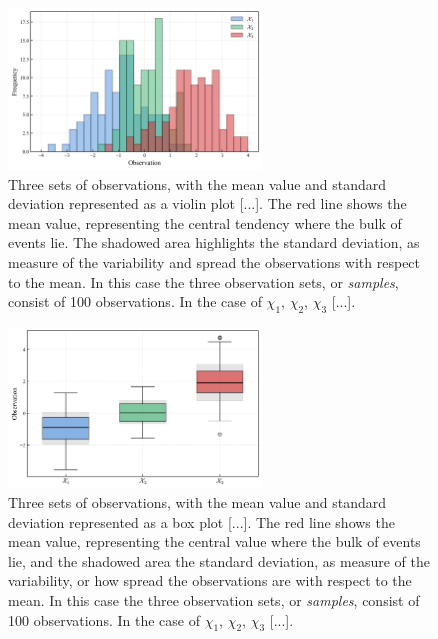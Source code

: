 \documentclass{book}
\begin{document}
\medskip

\begin{figure}[ht]
    \centering
    \includegraphics[width=0.6\textwidth]{figures/chapter1/mean_std_hist.png}
    \caption{Three sets of observations, with the mean value and standard deviation represented as a violin plot [...]. The red line shows the mean value, representing the central tendency where the bulk of events lie. The shadowed area highlights the standard deviation, as measure of the variability and spread the observations with respect to the mean. In this case the three observation sets, or \textit{samples}, consist of 100 observations. In the case of $\chi_1$, $\chi_2$, $\chi_3$ [...].}
    \label{fig:histogram1}
\end{figure}

\begin{figure}[ht]
    \centering
    \includegraphics[width=0.6\textwidth]{figures/chapter1/mean_std_box.png}
    \caption{Three sets of observations, with the mean value and standard deviation represented as a box plot [...]. The red line shows the mean value, representing the central value where the bulk of events lie, and the shadowed area the standard deviation, as measure of the variability, or how spread the observations are with respect to the mean. In this case the three observation sets, or \textit{samples}, consist of 100 observations. In the case of $\chi_1$, $\chi_2$, $\chi_3$ [...].}
    \label{fig:histogram1}
\end{figure}
\end{document}
